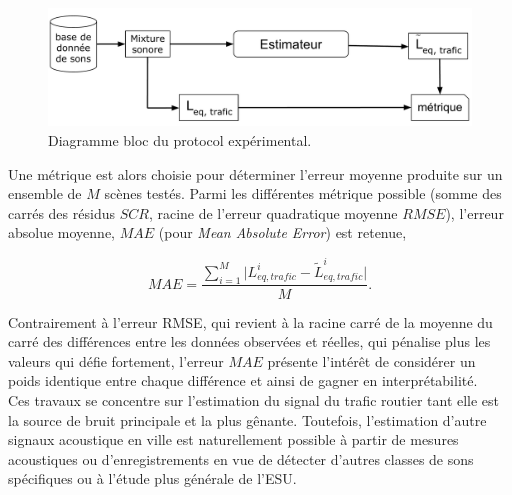 \begin{figure}[t]
\centering
\includegraphics[width=0.7\linewidth]{./figures/NMF/Bloc_diagram_estimateur_FR.pdf}
\caption{Diagramme bloc du protocol expérimental.}
\label{fig:diagramBlocProtocol}
\end{figure}


Une métrique est alors choisie pour déterminer l'erreur moyenne produite sur un ensemble de $M$ scènes testés. Parmi les différentes métrique possible (somme des carrés des résidus $SCR$, racine de l'erreur quadratique moyenne $RMSE$), l'erreur absolue moyenne, $MAE$ (pour \textit{Mean Absolute Error}) est retenue,  

\begin{equation}
MAE = \frac{\sum_{i = 1}^{M} \vert L_{eq, trafic}^i - \tilde{L}_{eq, trafic}^i \vert}{M}.
\end{equation}

Contrairement à l'erreur RMSE, qui revient à la racine carré de la moyenne du carré des différences entre les données observées et réelles, qui pénalise plus les valeurs qui défie fortement, l'erreur $MAE$ présente l'intérêt de considérer un poids identique entre chaque différence et ainsi de gagner en interprétabilité.\\

Ces travaux se concentre sur l'estimation du signal du trafic routier tant elle est la source de bruit principale et la plus gênante. Toutefois, l'estimation d'autre signaux acoustique en ville est naturellement possible à partir de mesures acoustiques ou d'enregistrements en vue de détecter d'autres classes de sons spécifiques ou à l'étude plus générale de l'ESU.




